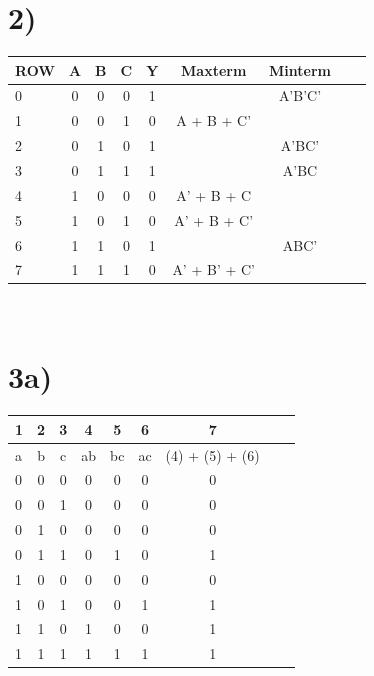 \documentclass[a4paper,11pt]{article}
\begin{document}
\section*{2)} 
\begin{tabular}{| l | c | c | c | c | c | c | c | c |}
  \hline	
    ROW & A & B & C & Y & Maxterm & Minterm  \\  \hline \hline
    0 & 0 & 0 & 0 & 1 &  &   A'B'C' \\  \hline 
    1 & 0 & 0 & 1 & 0 & A + B + C' &   \\  \hline 
    2 & 0 & 1 & 0 & 1 &  & A'BC'  \\  \hline 
    3 & 0 & 1 & 1 & 1 &  &  A'BC \\  \hline 
    4 & 1 & 0 & 0 & 0 & A' + B + C &   \\  \hline 
    5 & 1 & 0 & 1 & 0 & A' + B + C' &   \\  \hline 
    6 & 1 & 1 & 0 & 1 &  &  ABC' \\  \hline 
    7 & 1 & 1 & 1 & 0 & A' + B' + C' &   \\  \hline 
\end{tabular} \\


\section*{3a)}
\begin{tabular}{| l | c | c | c | c | c | c | c | c |}
  \hline	
    1 & 2 & 3 & 4 & 5 & 6 & 7  \\  \hline \hline
    a & b & c & ab & bc & ac & (4) + (5) + (6)  \\  \hline \hline
    0 & 0 & 0 & 0 & 0 & 0 & 0  \\  \hline 
    0 & 0 & 1 & 0 & 0 & 0 & 0  \\  \hline 
    0 & 1 & 0 & 0 & 0 & 0 & 0  \\  \hline 
    0 & 1 & 1 & 0 & 1 & 0 & 1  \\  \hline 
    1 & 0 & 0 & 0 & 0 & 0 & 0  \\  \hline 
    1 & 0 & 1 & 0 & 0 & 1 & 1  \\  \hline 
    1 & 1 & 0 & 1 & 0 & 0 & 1  \\  \hline 
    1 & 1 & 1 & 1 & 1 & 1 & 1  \\  \hline 
\end{tabular} \\
\end{document}

